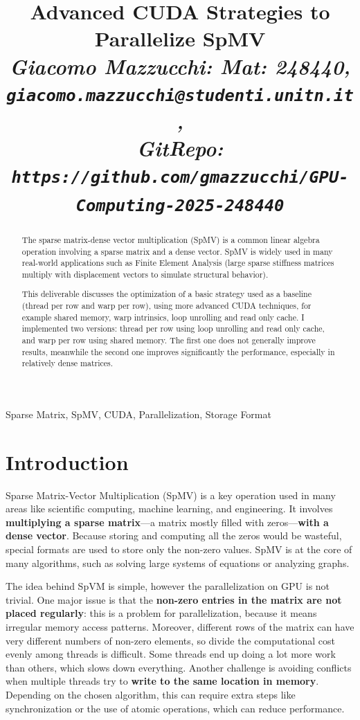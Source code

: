 \documentclass[conference]{IEEEtran}
\begin{document}
\title{Advanced CUDA Strategies to Parallelize SpMV  \\
\footnotesize \textit{Giacomo Mazzucchi: Mat: 248440, \texttt{giacomo.mazzucchi@studenti.unitn.it}, \\GitRepo: \texttt{https://github.com/gmazzucchi/GPU-Computing-2025-248440}}}

\maketitle

\begin{abstract}
The sparse matrix-dense vector multiplication (SpMV) is a common linear algebra operation involving a sparse matrix and a dense vector. SpMV is widely used in many real-world applications such as Finite Element Analysis (large sparse stiffness matrices multiply with displacement vectors to simulate structural behavior).

This deliverable discusses the optimization of a basic strategy used as a baseline (thread per row and warp per row), using more advanced CUDA techniques, for example shared memory, warp intrinsics, loop unrolling and read only cache. I implemented two versions: thread per row using loop unrolling and read only cache, and warp per row using shared memory. The first one does not generally improve results, meanwhile the second one improves significantly the performance, especially in relatively dense matrices.

\end{abstract}

\begin{IEEEkeywords}
Sparse Matrix, SpMV, CUDA, Parallelization, Storage Format
\end{IEEEkeywords}

\section{Introduction}
Sparse Matrix-Vector Multiplication (SpMV) is a key operation used in many areas like scientific computing, machine learning, and engineering. It involves \textbf{multiplying a sparse matrix}—a matrix mostly filled with zeros—\textbf{with a dense vector}. Because storing and computing all the zeros would be wasteful, special formats are used to store only the non-zero values. SpMV is at the core of many algorithms, such as solving large systems of equations or analyzing graphs.

The idea behind SpVM is simple, however the parallelization on GPU is not trivial. One major issue is that the \textbf{non-zero entries in the matrix are not placed regularly}: this is a problem for parallelization, because it means irregular memory access patterns. Moreover, different rows of the matrix can have very different numbers of non-zero elements, so divide the computational cost evenly among threads is difficult. Some threads end up doing a lot more work than others, which slows down everything. Another challenge is avoiding conflicts when multiple threads try to \textbf{write to the same location in memory}. Depending on the chosen algorithm, this can require extra steps like synchronization or the use of atomic operations, which can reduce performance.
\end{document}
